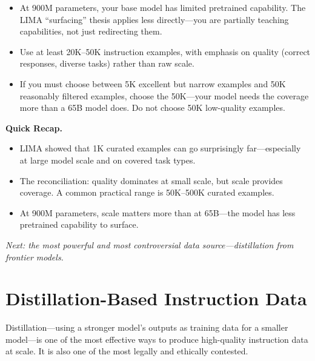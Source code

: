 \begin{tcolorbox}[colback=orange!5, colframe=orange!60, title=\textbf{For Project~3: The LIMA Lesson at 900M Scale}]
\begin{itemize}[nosep]
  \item At 900M parameters, your base model has limited pretrained capability. The LIMA ``surfacing'' thesis applies less directly---you are partially teaching capabilities, not just redirecting them.
  \item Use at least 20K--50K instruction examples, with emphasis on quality (correct responses, diverse tasks) rather than raw scale.
  \item If you must choose between 5K excellent but narrow examples and 50K reasonably filtered examples, choose the 50K---your model needs the coverage more than a 65B model does. Do not choose 50K low-quality examples.
\end{itemize}
\end{tcolorbox}

\begin{quickrecap}
\textbf{Quick Recap.}
\begin{itemize}[nosep,leftmargin=1.5em]
  \item LIMA showed that 1K curated examples can go surprisingly far---especially at large model scale and on covered task types.
  \item The reconciliation: quality dominates at small scale, but scale provides coverage. A common practical range is 50K--500K curated examples.
  \item At 900M parameters, scale matters more than at 65B---the model has less pretrained capability to surface.
\end{itemize}
\textit{Next: the most powerful and most controversial data source---distillation from frontier models.}
\end{quickrecap}


\section{Distillation-Based Instruction Data}
\label{sec:distillation-data}

Distillation---using a stronger model's outputs as training data for a smaller model---is one of the most effective ways to produce high-quality instruction data at scale. It is also one of the most legally and ethically contested.

